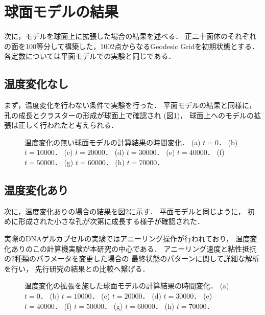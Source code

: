 \section{球面モデルの結果}

次に，モデルを球面上に拡張した場合の結果を述べる．
正二十面体のそれぞれの面を100等分して構築した，1002点からなるGeodesic Gridを初期状態とする．
各定数については平面モデルでの実験と同じである．

\subsection{温度変化なし}

まず，温度変化を行わない条件で実験を行った．
平面モデルの結果と同様に，
孔の成長とクラスターの形成が球面上で確認され
(図\ref{fig:result_sphere_without_anearing})，
球面上へのモデルの拡張は正しく行われたと考えられる．

\begin{figure}
\centering

\caption{
    温度変化の無い球面モデルの計算結果の時間変化．
    (a) $t=0$．
    (b) $t=10000$．
    (c) $t=20000$．
    (d) $t=30000$．
    (e) $t=40000$．
    (f) $t=50000$．
    (g) $t=60000$．
    (h) $t=70000$．
}
\label{fig:result_sphere_without_anearing}
\end{figure}


\subsection{温度変化あり}

次に，温度変化ありの場合の結果を図\ref{fig:result_sphere_with_anearing}に示す．
平面モデルと同じように，
初めに形成された小さな孔が次第に成長する様子が確認された．

実際のDNAゲルカプセルの実験ではアニーリング操作が行われており，
温度変化ありのこの計算機実験が本研究の中心である．
アニーリング速度と粘性抵抗の2種類のパラメータを変更した場合の
最終状態のパターンに関して詳細な解析を行い，
先行研究の結果との比較へ繋げる．

\begin{figure}
\centering

\caption{
    温度変化の拡張を施した球面モデルの計算結果の時間変化．
    (a) $t=0$．
    (b) $t=10000$．
    (c) $t=20000$．
    (d) $t=30000$．
    (e) $t=40000$．
    (f) $t=50000$．
    (g) $t=60000$．
    (h) $t=70000$．
}
\label{fig:result_sphere_with_anearing}
\end{figure}

